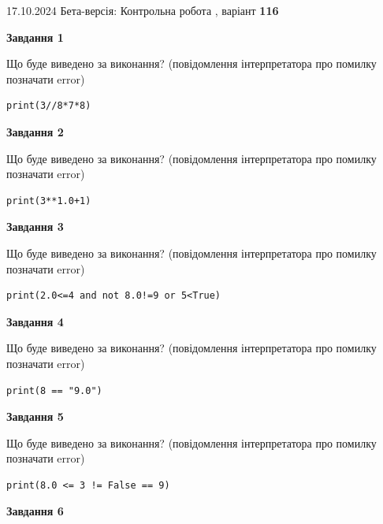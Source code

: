 \documentclass[12pt, ukrainian]{article}
\begin{document}
{\Large{17.10.2024 Бета-версія: Контрольна робота , варіант  \No \textbf { 116 }\par}}
{
\begin {large}
{\begin {center}\textbf{Завдання 1}\end {center}}

Що буде виведено за виконання? (повідомлення інтерпретатора про помилку позначати error)\par
\begin{verbatim}
print(3//8*7*8)
\end{verbatim}

{\begin {center}\textbf{Завдання 2}\end {center}}

Що буде виведено за виконання? (повідомлення інтерпретатора про помилку позначати error)\par
\begin{verbatim}
print(3**1.0+1)
\end{verbatim}

{\begin {center}\textbf{Завдання 3}\end {center}}

Що буде виведено за виконання? (повідомлення інтерпретатора про помилку позначати error)\par
\begin{verbatim}
print(2.0<=4 and not 8.0!=9 or 5<True)
\end{verbatim}

{\begin {center}\textbf{Завдання 4}\end {center}}

Що буде виведено за виконання? (повідомлення інтерпретатора про помилку позначати error)\par
\begin{verbatim}
print(8 == "9.0")
\end{verbatim}

{\begin {center}\textbf{Завдання 5}\end {center}}

Що буде виведено за виконання? (повідомлення інтерпретатора про помилку позначати error)\par
\begin{verbatim}
print(8.0 <= 3 != False == 9)
\end{verbatim}

{\begin {center}\textbf{Завдання 6}\end {center}}


\end{large}}
\end{document}
